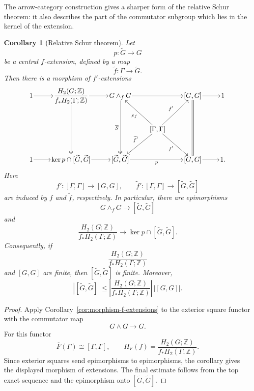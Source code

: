 \documentclass[10pt]{amsart}
\newtheorem{corollary}[theorem]{Corollary}
\renewcommand{\*}{\cdot {\dots} \cdot}
\newcommand{\?}[1]{\overset{?}{#1}}
\numberwithin{equation}{section}
\begin{document}
The arrow-category construction gives a sharper form of the
relative Schur theorem: it also describes the part of the
commutator subgroup which lies in the kernel of the extension.

\begin{corollary}[Relative Schur theorem]
\label{cor:relative-schur}
Let
\[
p\colon\widetilde G\longrightarrow G
\]
be a central $f$-extension, defined by a map
\[
\widetilde f\colon\Gamma\longrightarrow\widetilde G.
\]
Then there is a morphism of $f'$-extensions
\[
\begin{tikzcd}[
  row sep=3.0em,
  column sep=2.5em,
  cells={nodes={inner sep=1pt}}
]
1 \arrow[r]
&
\dfrac{H_2(G;\mathbb Z)}{f_*H_2(\Gamma;\mathbb Z)}
  \arrow[r]
  \arrow[dd,two heads]
&
G\wedge_fG
  \arrow[rr]
  \arrow[dd,two heads,"\overline S"']
&&
{[G,G]}
  \arrow[r]
  \arrow[dd,equal]
&
1
\\
&&&
{[\Gamma,\Gamma]}
  \arrow[ul,"\rho_f"]
  \arrow[ur,"f'"]
  \arrow[dl,"\widetilde f'"']
  \arrow[dr,"f'"']
&&
\\
1 \arrow[r]
&
{\ker p\cap[\widetilde G,\widetilde G]}
  \arrow[r]
&
{[\widetilde G,\widetilde G]}
  \arrow[rr,"p"']
&&
{[G,G]}
  \arrow[r]
&
1 .
\end{tikzcd}
\]
Here
\[
f'\colon[\Gamma,\Gamma]\longrightarrow[G,G],
\qquad
\widetilde f'\colon[\Gamma,\Gamma]
\longrightarrow[\widetilde G,\widetilde G]
\]
are induced by $f$ and $\widetilde f$, respectively. In
particular, there are epimorphisms
\[
G\wedge_fG\longrightarrow[\widetilde G,\widetilde G]
\]
and
\[
\frac{H_2(G;\mathbb Z)}{f_*H_2(\Gamma;\mathbb Z)}
\longrightarrow
\ker p\cap[\widetilde G,\widetilde G].
\]
Consequently, if
\[
\frac{H_2(G;\mathbb Z)}{f_*H_2(\Gamma;\mathbb Z)}
\]
and $[G,G]$ are finite, then $[\widetilde G,\widetilde G]$ is
finite. Moreover,
\[
|[\widetilde G,\widetilde G]|
\leq
\left|
\frac{H_2(G;\mathbb Z)}{f_*H_2(\Gamma;\mathbb Z)}
\right|
\,|[G,G]|.
\]
\end{corollary}

\begin{proof}
Apply Corollary~\ref{cor:morphism-f-extensions} to the exterior
square functor with the commutator map
\[
G\wedge G\longrightarrow G.
\]
For this functor
\[
\overline F(\Gamma)\cong[\Gamma,\Gamma],
\qquad
H_F(f)=
\frac{H_2(G;\mathbb Z)}{f_*H_2(\Gamma;\mathbb Z)}.
\]
Since exterior squares send epimorphisms to epimorphisms, the
corollary gives the displayed morphism of extensions. The final
estimate follows from the top exact sequence and the epimorphism
onto $[\widetilde G,\widetilde G]$.
\end{proof}
\end{document}
